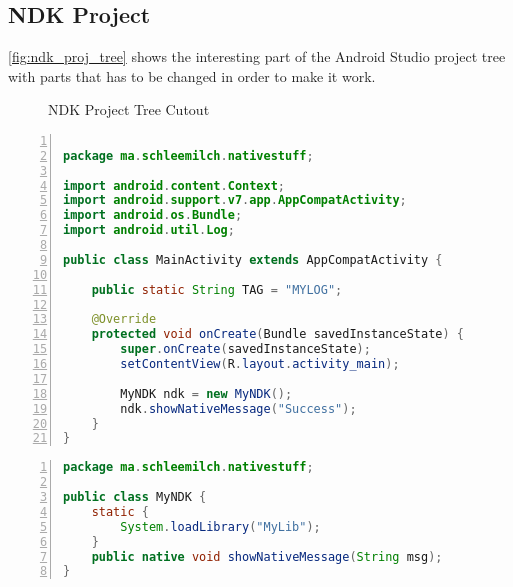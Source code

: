 \begin{appendices}
\chapter{NDK Project}\label{chapter:ndk_sample_project}

\autoref{fig:ndk_proj_tree} shows the interesting part of the Android Studio project tree
with parts that has to be changed in order to make it work.

\begin{figure}[htb]
\caption[NDK Project Tree Cutout]{NDK Project Tree Cutout}
\label{fig:ndk_proj_tree}
\end{figure}

\begin{lstlisting}[language=Java, caption=MainActivity.java, label=nkd_sample_main, numbers=left]

package ma.schleemilch.nativestuff;

import android.content.Context;
import android.support.v7.app.AppCompatActivity;
import android.os.Bundle;
import android.util.Log;

public class MainActivity extends AppCompatActivity {

    public static String TAG = "MYLOG";

    @Override
    protected void onCreate(Bundle savedInstanceState) {
        super.onCreate(savedInstanceState);
        setContentView(R.layout.activity_main);

        MyNDK ndk = new MyNDK();
        ndk.showNativeMessage("Success");
    }
}
\end{lstlisting}

\begin{lstlisting}[language=Java, caption=MyNDK.java, label=nkd_sample_interface, numbers=left]
package ma.schleemilch.nativestuff;

public class MyNDK {
    static {
        System.loadLibrary("MyLib");
    }
    public native void showNativeMessage(String msg);
}
\end{lstlisting}


\end{appendices}
